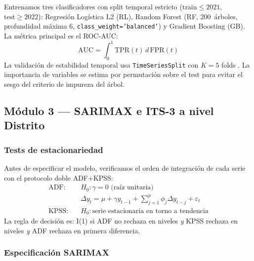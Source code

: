 \documentclass[10pt,a4paper,twocolumn]{article}
\begin{document}
Entrenamos tres clasificadores con split temporal estricto ($\text{train}\leq 2021$,
$\text{test}\geq 2022$): Regresión Logística L2 (RL), Random Forest (RF,
200~árboles, profundidad máxima 6, \texttt{class\_weight='balanced'}) y Gradient
Boosting (GB). La métrica principal es el ROC-AUC:
\begin{equation}
  \text{AUC} = \int_0^1 \text{TPR}(t)\, d\,\text{FPR}(t)
  \label{eq:auc}
\end{equation}
La validación de estabilidad temporal usa \texttt{TimeSeriesSplit} con $K{=}5$
folds \citep{bergmeir2018note}. La importancia de variables se estima por
permutación sobre el test para evitar el sesgo del criterio de impureza del árbol.

\subsection{Módulo 3 --- SARIMAX e ITS-3 a nivel Distrito}

\subsubsection{Tests de estacionariedad}

Antes de especificar el modelo, verificamos el orden de integración de cada serie
con el protocolo doble ADF+KPSS:
\begin{align}
  \text{ADF:}&\quad H_0: \gamma = 0 \text{ (raíz unitaria)} \nonumber\\
  &\quad \Delta y_t = \mu + \gamma y_{t-1} + \sum_{j=1}^p \phi_j \Delta y_{t-j} + \varepsilon_t
  \label{eq:adf}\\
  \text{KPSS:}&\quad H_0: \text{serie estacionaria en torno a tendencia}
  \label{eq:kpss}
\end{align}
La regla de decisión es: I(1) si ADF no rechaza en niveles \textit{y} KPSS rechaza
en niveles \textit{y} ADF rechaza en primera diferencia.

\subsubsection{Especificación SARIMAX}
\end{document}

